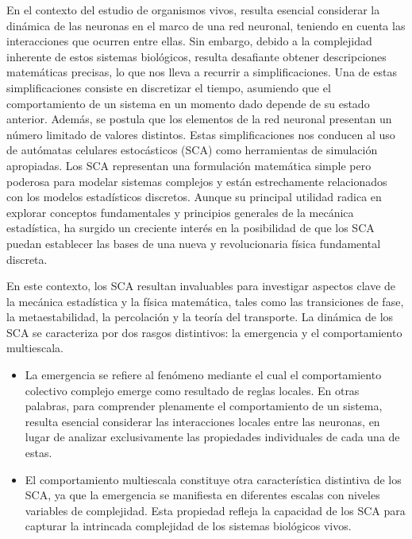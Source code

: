 En el contexto del estudio de organismos vivos, resulta esencial considerar la dinámica de las neuronas en el marco de una red neuronal, teniendo en cuenta las interacciones que ocurren entre ellas. Sin embargo, debido a la complejidad inherente de estos sistemas biológicos, resulta desafiante obtener descripciones matemáticas precisas, lo que nos lleva a recurrir a simplificaciones. Una de estas simplificaciones consiste en discretizar el tiempo, asumiendo que el comportamiento de un sistema en un momento dado depende de su estado anterior. Además, se postula que los elementos de la red neuronal presentan un número limitado de valores distintos. Estas simplificaciones nos conducen al uso de autómatas celulares estocásticos (SCA) como herramientas de simulación apropiadas. Los SCA representan una formulación matemática simple pero poderosa para modelar sistemas complejos y están estrechamente relacionados con los modelos estadísticos discretos. Aunque su principal utilidad radica en explorar conceptos fundamentales y principios generales de la mecánica estadística, ha surgido un creciente interés en la posibilidad de que los SCA puedan establecer las bases de una nueva y revolucionaria física fundamental discreta.

En este contexto, los SCA resultan invaluables para investigar aspectos clave de la mecánica estadística y la física matemática, tales como las transiciones de fase, la metaestabilidad, la percolación y la teoría del transporte. La dinámica de los SCA se caracteriza por dos rasgos distintivos: la emergencia y el comportamiento multiescala.

\begin{itemize}
\item La emergencia se refiere al fenómeno mediante el cual el comportamiento colectivo complejo emerge como resultado de reglas locales. En otras palabras, para comprender plenamente el comportamiento de un sistema, resulta esencial considerar las interacciones locales entre las neuronas, en lugar de analizar exclusivamente las propiedades individuales de cada una de estas.
\item El comportamiento multiescala constituye otra característica distintiva de los SCA, ya que la emergencia se manifiesta en diferentes escalas con niveles variables de complejidad. Esta propiedad refleja la capacidad de los SCA para capturar la intrincada complejidad de los sistemas biológicos vivos.
\end{itemize}

